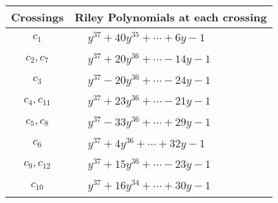 \documentclass[1p]{elsarticle_modified}
\theoremstyle{definition}
\begin{document}
\begin{tabular}{m{50pt}|m{274pt}}
Crossings & \hspace{64pt}Riley Polynomials at each crossing \\
\hline $$\begin{aligned}c_{1}\end{aligned}$$&$\begin{aligned}
&y^{37}+40 y^{35}+\cdots+6 y-1
\end{aligned}$\\
\hline $$\begin{aligned}c_{2},c_{7}\end{aligned}$$&$\begin{aligned}
&y^{37}+20 y^{36}+\cdots-14 y-1
\end{aligned}$\\
\hline $$\begin{aligned}c_{3}\end{aligned}$$&$\begin{aligned}
&y^{37}-20 y^{36}+\cdots-24 y-1
\end{aligned}$\\
\hline $$\begin{aligned}c_{4},c_{11}\end{aligned}$$&$\begin{aligned}
&y^{37}+23 y^{36}+\cdots-21 y-1
\end{aligned}$\\
\hline $$\begin{aligned}c_{5},c_{8}\end{aligned}$$&$\begin{aligned}
&y^{37}-33 y^{36}+\cdots+29 y-1
\end{aligned}$\\
\hline $$\begin{aligned}c_{6}\end{aligned}$$&$\begin{aligned}
&y^{37}+4 y^{36}+\cdots+32 y-1
\end{aligned}$\\
\hline $$\begin{aligned}c_{9},c_{12}\end{aligned}$$&$\begin{aligned}
&y^{37}+15 y^{36}+\cdots-23 y-1
\end{aligned}$\\
\hline $$\begin{aligned}c_{10}\end{aligned}$$&$\begin{aligned}
&y^{37}+16 y^{34}+\cdots+30 y-1
\end{aligned}$\\
\hline
\end{tabular}\\~\\
\end{document}
